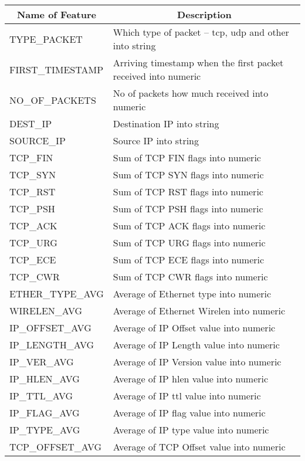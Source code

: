 \begin{table}
\begin{center}
\begin{tabular}{|p{3.1cm}|p{4.9cm}|}
\hline
\multicolumn{1}{|c|}{\bfseries Name of Feature} & \multicolumn{1}{c|}{\bfseries Description}\\
\hline
TYPE\_PACKET & Which type of packet – tcp, udp and other into string\\
\hline
FIRST\_TIMESTAMP & Arriving timestamp when the first packet received into numeric\\
\hline
NO\_OF\_PACKETS & No of packets how much received into numeric\\
\hline
DEST\_IP & Destination IP into string\\
\hline
SOURCE\_IP & Source IP into string\\
\hline
TCP\_FIN & Sum of TCP FIN flags into numeric\\
\hline
TCP\_SYN & Sum of TCP SYN flags into numeric\\
\hline
TCP\_RST & Sum of TCP RST flags into numeric\\
\hline
TCP\_PSH & Sum of TCP PSH flags into numeric\\
\hline
TCP\_ACK & Sum of TCP ACK flags into numeric\\
\hline
TCP\_URG & Sum of TCP URG flags into numeric\\
\hline
TCP\_ECE & Sum of TCP ECE flags into numeric\\
\hline
TCP\_CWR & Sum of TCP CWR flags into numeric\\
\hline
ETHER\_TYPE\_AVG & Average of Ethernet type into numeric\\
\hline
WIRELEN\_AVG & Average of Ethernet Wirelen into numeric\\
\hline
IP\_OFFSET\_AVG & Average of IP Offset value into numeric\\
\hline
IP\_LENGTH\_AVG & Average of IP Length value into numeric\\
\hline
IP\_VER\_AVG & Average of IP Version value into numeric\\
\hline
IP\_HLEN\_AVG & Average of IP hlen value into numeric\\
\hline
IP\_TTL\_AVG & Average of IP ttl value into numeric\\
\hline
IP\_FLAG\_AVG & Average of IP flag value into numeric\\
\hline
IP\_TYPE\_AVG & Average of IP type value into numeric\\
\hline
TCP\_OFFSET\_AVG & Average of TCP Offset value into numeric\\

\end{tabular}
\end{center}
\end{table}
